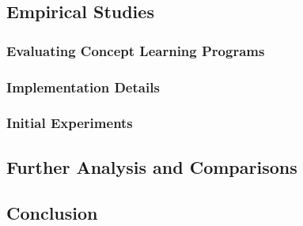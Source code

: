 \documentclass[../main.tex]{subfiles}
\begin{document}
\subsection{Empirical Studies}

\subsubsection{Evaluating Concept Learning Programs}

\subsubsection{Implementation Details}

\subsubsection{Initial Experiments}

\subsection{Further Analysis and Comparisons}

\subsection{Conclusion}
\end{document}
